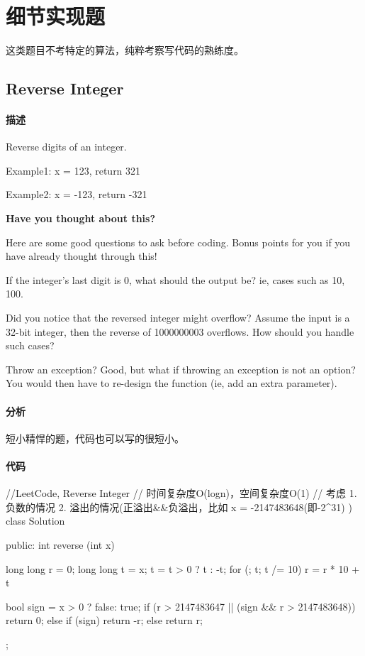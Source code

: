 \chapter{细节实现题}
这类题目不考特定的算法，纯粹考察写代码的熟练度。


\section{Reverse Integer} %
\label{sec:reverse-integer}


\subsubsection{描述}
Reverse digits of an integer.

Example1: x = 123, return 321

Example2: x = -123, return -321


\textbf{Have you thought about this?}

Here are some good questions to ask before coding. Bonus points for you if you have already thought through this!

If the integer's last digit is 0, what should the output be? ie, cases such as 10, 100.

Did you notice that the reversed integer might overflow? Assume the input is a 32-bit integer, then the reverse of 1000000003 overflows. How should you handle such cases?

Throw an exception? Good, but what if throwing an exception is not an option? You would then have to re-design the function (ie, add an extra parameter).


\subsubsection{分析}
短小精悍的题，代码也可以写的很短小。


\subsubsection{代码}
\begin{Code}
//LeetCode, Reverse Integer
// 时间复杂度O(logn)，空间复杂度O(1)
// 考虑 1.负数的情况 2. 溢出的情况(正溢出&&负溢出，比如 x = -2147483648(即-2^31) )
class Solution {
public:
    int reverse (int x) {
        long long r = 0;
        long long t = x;
        t = t > 0 ? t : -t;
        for (; t; t /= 10)
            r = r * 10 + t %

        bool sign = x > 0 ? false: true;
        if (r > 2147483647 || (sign && r > 2147483648)) {
            return 0;
        } else {
            if (sign) {
                return -r;
            } else {
                return r;
            }
        }
    }
};
\end{Code}



